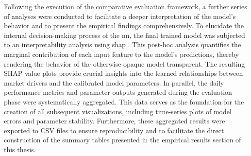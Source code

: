 Following the execution of the comparative evaluation framework, a further series of analyses were conducted to facilitate a deeper interpretation of the model's behavior and to present the empirical findings comprehensively. To elucidate the internal decision-making process of the \ac{nn}, the final trained model was subjected to an interpretability analysis using \ac{shap} \parencite{lundberg2017unifiedapproachinterpretingmodel}. This post-hoc analysis quantifies the marginal contribution of each input feature to the model's predictions, thereby rendering the behavior of the otherwise opaque model transparent. The resulting SHAP value plots provide crucial insights into the learned relationships between market drivers and the calibrated model parameters. In parallel, the daily performance metrics and parameter outputs generated during the evaluation phase were systematically aggregated. This data serves as the foundation for the creation of all subsequent visualizations, including time-series plots of model errors and parameter stability. Furthermore, these aggregated results were exported to CSV files to ensure reproducibility and to facilitate the direct construction of the summary tables presented in the empirical results section of this thesis.

